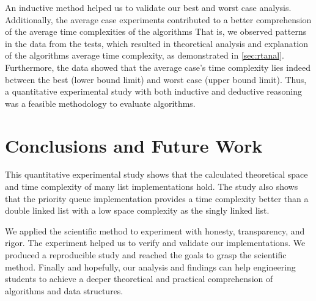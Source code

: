 \documentclass[a4paper,11pt]{kth-mag}
\newcommand*{\skippara}{\par\vspace{\baselineskip} \noindent}
\begin{document}
\skippara An inductive method helped us to validate our best and worst case analysis.
Additionally, the average case experiments contributed to a better comprehension of the average time complexities of the algorithms
That is, we observed patterns in the data from the tests, which resulted in theoretical analysis and explanation of the algorithms average time complexity, as demonstrated in \cref{sec:rtanal}.
Furthermore, the data showed that the average case's time complexity lies indeed between the best (lower bound limit) and worst case (upper bound limit).
Thus, a quantitative experimental study with both inductive and deductive reasoning was a feasible methodology to evaluate algorithms.


\chapter{Conclusions and Future Work}\label{chapter:conclusion}
This quantitative experimental study shows that the calculated theoretical space and time complexity of many list implementations hold.
The study also shows that the priority queue implementation provides a time complexity better than a double linked list with a low space complexity as the singly linked list.

\skippara We applied the scientific method to experiment with honesty, transparency, and rigor. The experiment helped us to verify and validate our implementations. We produced a reproducible study and reached the goals to grasp the scientific method. Finally and hopefully, our analysis and findings can help engineering students to achieve a deeper theoretical and practical comprehension of algorithms and data structures.
%
\appendix
\addappheadtotoc
\end{document}
